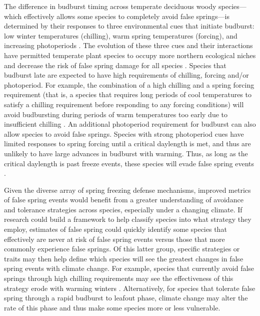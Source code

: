 \documentclass{article}\usepackage[]{graphicx}\usepackage[]{color}
\begin{document}
The difference in budburst timing across temperate deciduous woody species---which effectively allows some species to completely avoid false springs---is determined by their responses to three environmental cues that initiate budburst: low winter temperatures (chilling), warm spring temperatures (forcing), and increasing photoperiods \citep{Chuine2010}. The evolution of these three cues and their interactions have permitted temperate plant species to occupy more northern ecological niches \citep{Kollas2014} and decrease the risk of false spring damage for all species \citep{Charrier2011}. Species that budburst late are expected to have high requirements of chilling, forcing and/or photoperiod. For example, the combination of a high chilling and a spring forcing requirement (that is, a species that requires long periods of cool temperatures to satisfy a chilling requirement before responding to any forcing conditions) will avoid budbursting during periods of warm temperatures too early due to insufficient chilling \citep{Basler2012}. An additional photoperiod requirement for budburst can also allow species to avoid false springs. Species with strong photoperiod cues have limited responses to spring forcing until a critical daylength is met, and thus are unlikely to have large advances in budburst with warming. Thus, as long as the critical daylength is past freeze events, these species will evade false spring events \citep{Basler2014}. 

Given the diverse array of spring freezing defense mechanisms, improved metrics of false spring events would benefit from a greater understanding of avoidance and tolerance strategies across species, especially under a changing climate. If research could build a framework to help classify species into what strategy they employ, estimates of false spring could quickly identify some species that effectively are never at risk of false spring events versus those that more commonly experience false springs. Of this latter group, specific strategies or traits may then help define which species will see the greatest changes in false spring events with climate change. For example, species that currently avoid false springs through high chilling requirements may see the effectiveness of this strategy erode with warming winters \citep{Montwe2018}. Alternatively, for species that tolerate false spring through a rapid budburst to leafout phase, climate change may alter the rate of this phase and thus make some species more or less vulnerable. 
\end{document}
